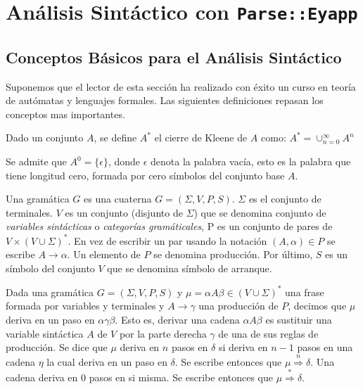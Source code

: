 \chapter{Análisis Sintáctico con {\tt Parse::Eyapp}}
\label{chapter:parseeyapp}
\section{Conceptos Básicos para el Análisis Sintáctico}
\label{section:conceptosbasicosanalisissintactico}
Suponemos que el lector de esta sección ha realizado con éxito
un curso en teoría de autómatas y lenguajes formales.
Las siguientes definiciones repasan los conceptos mas importantes.

\begin{definition}
Dado un conjunto $A$, se define $A^*$ el cierre de Kleene de $A$ como:
\begin{math}
A^* = \cup_{n=0}^{\infty} A^n
\end{math}

Se admite que $A^0 = \{ \epsilon \}$, donde $\epsilon$ denota la palabra vacía, esto es
la palabra que tiene longitud cero, formada por cero símbolos del conjunto base $A$.
\end{definition}

\begin{definition}
Una gramática $G$ es una cuaterna $G =(\Sigma,V,P,S)$. 
$\Sigma$ es el conjunto de terminales. $V$ es un conjunto (disjunto de $\Sigma$)
que se denomina conjunto de \emph{variables sintácticas} o \emph{categorías gramáticales},
P es un conjunto de pares de $V \times (V \cup \Sigma )^*$. En vez de escribir
un par usando la notación $(A, \alpha) \in P$ se escribe $A \rightarrow \alpha$.
Un elemento de $P$ se denomina producción. Por último, $S$ es un símbolo del conjunto
$V$ que se denomina símbolo de arranque.
\end{definition}

\begin{definition}
Dada una gramática $G=(\Sigma,V,P,S)$ y $\mu = \alpha A \beta \in (V \cup \Sigma)^*$
una frase formada por variables y terminales y $A \rightarrow \gamma$ una producción de 
$P$, decimos que  $\mu$ deriva en un paso en  $\alpha \gamma \beta$. Esto es, derivar 
una cadena $\alpha A \beta$ es sustituir 
una variable sintáctica $A$ de $V$ por la parte derecha $\gamma$ de una de sus reglas de producción.
Se dice que $\mu$ deriva en $n$ pasos en $\delta$ si deriva en $n-1$ pasos en una cadena
$\eta$ la cual deriva en un paso en $\delta$. 
Se escribe entonces que $\mu  \stackrel{n}{\Longrightarrow}  \delta$. 
Una cadena deriva en 0 pasos en si misma.
Se escribe entonces que $\mu  \stackrel{*}{\Longrightarrow}  \delta$. 
\end{definition}


